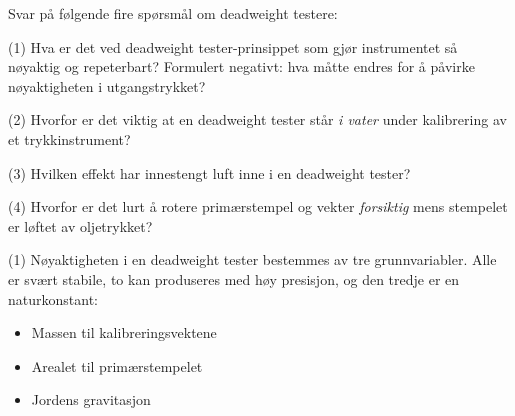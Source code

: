 
Svar på følgende fire spørsmål om deadweight testere:


\vskip 10pt {\narrower \noindent \baselineskip5pt

\noindent
(1) Hva er det ved deadweight tester-prinsippet som gjør instrumentet så nøyaktig og repeterbart? Formulert negativt: hva måtte endres for å påvirke nøyaktigheten i utgangstrykket?

\par} \vskip 10pt




\vskip 10pt {\narrower \noindent \baselineskip5pt

\noindent
(2) Hvorfor er det viktig at en deadweight tester står {\it i vater} under kalibrering av et trykkinstrument?

\par} \vskip 10pt



\vskip 10pt {\narrower \noindent \baselineskip5pt

\noindent
(3) Hvilken effekt har innestengt luft inne i en deadweight tester?

\par} \vskip 10pt




\vskip 10pt {\narrower \noindent \baselineskip5pt

\noindent
(4) Hvorfor er det lurt å rotere primærstempel og vekter {\it forsiktig} mens stempelet er løftet av oljetrykket?

\par} \vskip 10pt









\vskip 10pt {\narrower \noindent \baselineskip5pt

\noindent
(1) Nøyaktigheten i en deadweight tester bestemmes av tre grunnvariabler. Alle er svært stabile, to kan produseres med høy presisjon, og den tredje er en naturkonstant:

\begin{itemize}
\item{} Massen til kalibreringsvektene
\item{} Arealet til primærstempelet
\item{} Jordens gravitasjon
\end{itemize}

\par} \vskip 10pt




